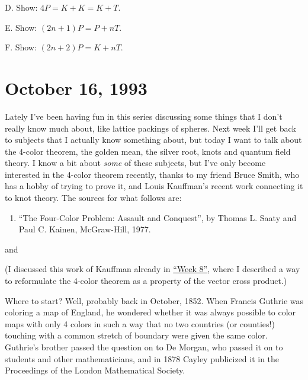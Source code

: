 \documentclass{article}
\def\tightlist{}
\renewcommand{\texttt}[1]{%
  \begingroup
  \ttfamily
  \begingroup\lccode`~=`/\lowercase{\endgroup\def~}{/\discretionary{}{}{}}%
  \begingroup\lccode`~=`[\lowercase{\endgroup\def~}{[\discretionary{}{}{}}%
  \begingroup\lccode`~=`.\lowercase{\endgroup\def~}{.\discretionary{}{}{}}%
  \catcode`/=\active\catcode`[=\active\catcode`.=\active
  \scantokens{#1\noexpand}%
  \endgroup
}
\begin{document}
D. Show: \(4P = K + K = K + T\).

E. Show: \((2n+1)P = P + nT\).

F. Show: \((2n+2)P = K + nT\).
\hypertarget{week22}{%
\section{October 16, 1993}\label{week22}}

Lately I've been having fun in this series discussing some things that I
don't really know much about, like lattice packings of spheres. Next
week I'll get back to subjects that I actually know something about, but
today I want to talk about the 4-color theorem, the golden mean, the
silver root, knots and quantum field theory. I know a bit about
\emph{some} of these subjects, but I've only become interested in the
4-color theorem recently, thanks to my friend Bruce Smith, who has a
hobby of trying to prove it, and Louis Kauffman's recent work connecting
it to knot theory. The sources for what follows are:

\begin{enumerate}
\def\labelenumi{\arabic{enumi})}
\tightlist
\item
  ``The Four-Color Problem: Assault and Conquest'', by Thomas L. Saaty
  and Paul C. Kainen, McGraw-Hill, 1977.
\end{enumerate}

and


(I discussed this work of Kauffman already in
\protect\hyperlink{week8}{``Week 8''}, where I described a way to
reformulate the 4-color theorem as a property of the vector cross
product.)

Where to start? Well, probably back in October, 1852. When Francis
Guthrie was coloring a map of England, he wondered whether it was always
possible to color maps with only 4 colors in such a way that no two
countries (or counties!) touching with a common stretch of boundary were
given the same color. Guthrie's brother passed the question on to De
Morgan, who passed it on to students and other mathematicians, and in
1878 Cayley publicized it in the Proceedings of the London Mathematical
Society.
\end{document}
